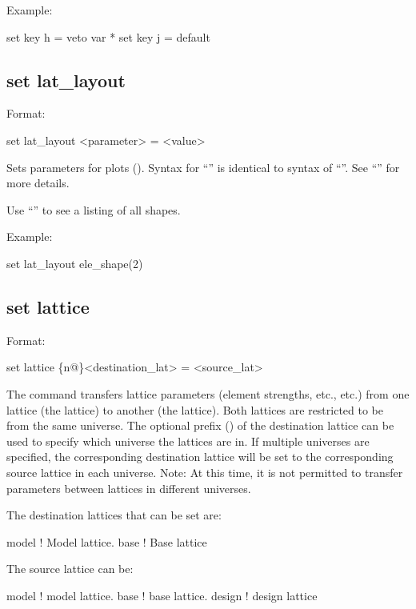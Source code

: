 {{{Example:
\begin{example}
  set key h = veto var *
  set key j = default
\end{example}



\subsection{set lat_layout}
\label{s:set.lat.layout}

Format:
\begin{example}
  set lat_layout <parameter> = <value>
\end{example}

Sets parameters for  plots ().  Syntax for ``'' is
identical to syntax of ``''.  See ``'' for more details.

Use ``'' to see a listing of all shapes. 

Example:
\begin{example}
  set lat_layout ele_shape(2)%
\end{example}


\subsection{set lattice}
\label{s:set.lattice}

Format:
\begin{example}
  set lattice \{n@\}<destination_lat> = <source_lat>
\end{example}

The  command transfers lattice parameters (element strengths, etc., etc.)  from one
lattice (the  lattice) to another (the  lattice). Both lattices are
restricted to be from the same universe. The optional  prefix () of the
destination lattice can be used to specify which universe the lattices are in. If multiple universes
are specified, the corresponding destination lattice will be set to the corresponding source lattice
in each universe. Note: At this time, it is not permitted to transfer parameters between lattices in
different universes.

The destination lattices that can be set are:
\begin{example}
  model      ! Model lattice.
  base       ! Base lattice
\end{example}
The source lattice can be:
\begin{example}
  model       ! model lattice.
  base        ! base lattice.
  design      ! design lattice
\end{example}

}}}
